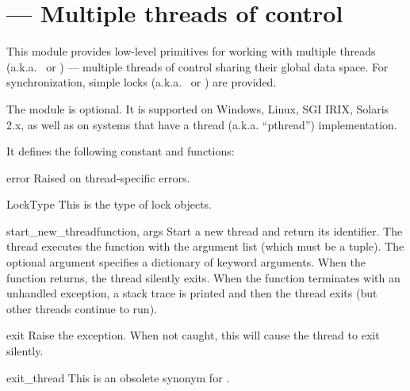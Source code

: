 \section{ ---
         Multiple threads of control}



This module provides low-level primitives for working with multiple
threads (a.k.a.\  or ) --- multiple
threads of control sharing their global data space.  For
synchronization, simple locks (a.k.a.\  or ) are provided.

The module is optional.  It is supported on Windows, Linux, SGI
IRIX, Solaris 2.x, as well as on systems that have a \POSIX{} thread
(a.k.a. ``pthread'') implementation.

It defines the following constant and functions:

\begin{excdesc}{error}
Raised on thread-specific errors.
\end{excdesc}

\begin{datadesc}{LockType}
This is the type of lock objects.
\end{datadesc}

\begin{funcdesc}{start_new_thread}{function, args}
Start a new thread and return its identifier.  The thread executes the function
 with the argument list  (which must be a tuple).  The
optional  argument specifies a dictionary of keyword arguments.
When the function returns, the thread silently exits.  When the function
terminates with an unhandled exception, a stack trace is printed and
then the thread exits (but other threads continue to run).
\end{funcdesc}

\begin{funcdesc}{exit}{}
Raise the  exception.  When not caught, this
will cause the thread to exit silently.
\end{funcdesc}

\begin{funcdesc}{exit_thread}{}
This is an obsolete synonym for .
\end{funcdesc}

